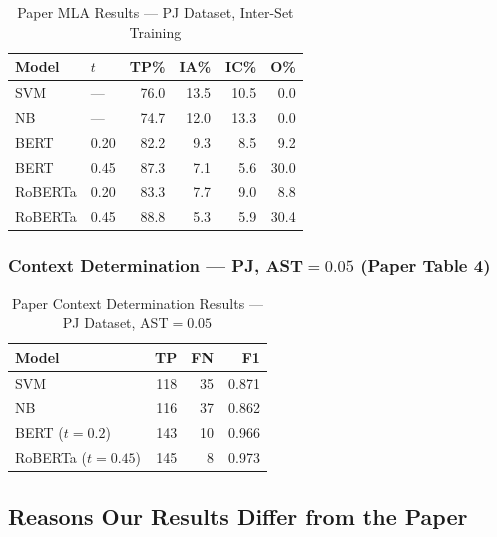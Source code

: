 \documentclass[12pt,a4paper]{article}
\begin{document}
\begin{table}[H]
  \centering
  \caption{Paper MLA Results --- PJ Dataset, Inter-Set Training}
  \begin{tabular}{llrrrr}
    \toprule
    \textbf{Model} & \textbf{$t$} & \textbf{TP\%} & \textbf{IA\%} &
    \textbf{IC\%} & \textbf{O\%} \\
    \midrule
    SVM       & ---  & 76.0 & 13.5 & 10.5 &  0.0 \\
    NB        & ---  & 74.7 & 12.0 & 13.3 &  0.0 \\
    BERT      & 0.20 & 82.2 &  9.3 &  8.5 &  9.2 \\
    BERT      & 0.45 & 87.3 &  7.1 &  5.6 & 30.0 \\
    RoBERTa   & 0.20 & 83.3 &  7.7 &  9.0 &  8.8 \\
    RoBERTa   & 0.45 & 88.8 &  5.3 &  5.9 & 30.4 \\
    \bottomrule
  \end{tabular}
  \label{tab:mla_paper}
\end{table}

\subsubsection{Context Determination --- PJ, AST$=0.05$ (Paper Table 4)}

\begin{table}[H]
  \centering
  \caption{Paper Context Determination Results --- PJ Dataset, AST$=0.05$}
  \begin{tabular}{lrrr}
    \toprule
    \textbf{Model} & \textbf{TP} & \textbf{FN} & \textbf{F1} \\
    \midrule
    SVM                   & 118 & 35 & 0.871 \\
    NB                    & 116 & 37 & 0.862 \\
    BERT ($t=0.2$)        & 143 & 10 & 0.966 \\
    RoBERTa ($t=0.45$)    & 145 &  8 & 0.973 \\
    \bottomrule
  \end{tabular}
  \label{tab:ctx_paper}
\end{table}

\subsection{Reasons Our Results Differ from the Paper}
\end{document}
